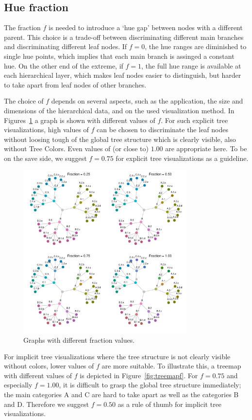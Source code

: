 \documentclass[journal]{vgtc}                %
\begin{document}
\subsection{Hue fraction}\label{secf}

The fraction $f$ is needed to introduce a `hue gap' between nodes with a different parent. This choice is a trade-off between discriminating different main branches and discriminating different leaf nodes. If $f=0$, the hue ranges are diminished to single hue points, which implies that each main branch is assinged a constant hue. On the other end of the extreme, if $f=1$, the full hue range is available at each hierarchical layer, which makes leaf nodes easier to distinguish, but harder to take apart from leaf nodes of other branches.

The choice of $f$ depends on several aspects, such as the application, the size and dimensions of the hierarchical data, and on the used visualization method. In Figures~\ref{fig:graphf} a graph is shown with different values of $f$. For such explicit tree visualizations, high values of $f$ can be chosen to discriminate the leaf nodes without loosing tough of the global tree structure which is clearly visible, also without Tree Colors. Even values of (or close to) $1.00$ are appropriate here. To be on the save side, we suggest $f=0.75$ for explicit tree visualizations as a guideline.

\begin{figure}[htb]
  \centering
  \includegraphics[width=3.5in]{Graph_hue.pdf}
  \caption{Graphs with different fraction values.}\label{fig:graphf}
\end{figure}

For implicit tree visualizations where the tree structure is not clearly visible without colors, lower values of $f$ are more suitable. To illustrate this, a treemap with different values of $f$ is depicted in Figure~\ref{fig:treemapf}. For $f=0.75$ and especially $f=1.00$, it is difficult to grasp the global tree structure immediately; the main categories A and C are hard to take apart as well as the categories B and D. Therefore we suggest $f=0.50$ as a rule of thumb for implicit tree visualizations.
\end{document}
